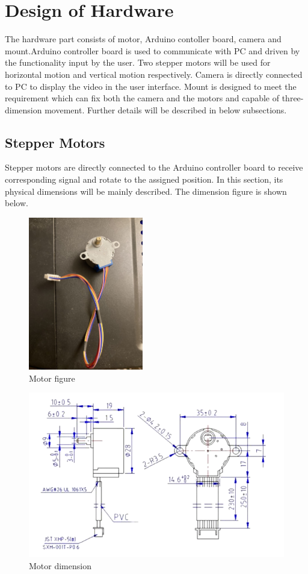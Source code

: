 \documentclass[12pt, titlepage]{article}
\begin{document}
\section{Design of Hardware}
The hardware part consists of motor, Arduino contoller board, camera and mount.Arduino controller board is used to communicate with PC and driven by the functionality input by the user. Two stepper motors will be used for horizontal motion and vertical motion respectively. Camera is directly connected to PC to display the video in the user interface. Mount is designed to meet the requirement which can fix both the camera and the motors and capable of three-dimension movement. Further details will be described in below subsections.
\subsection{Stepper Motors}
Stepper motors are directly connected to the Arduino controller board to receive corresponding signal and rotate to the assigned position. In this section, its physical dimensions will be mainly described. The dimension figure is shown below.
\begin{figure}[H]
\caption{Motor figure}
\centering
\includegraphics[width=5cm]{motor_figure.jpg}
\end{figure}
\begin{figure}[H]
\caption{Motor dimension}
\centering
\includegraphics[width=\textwidth]{motor.png}
\end{figure}
\end{document}
